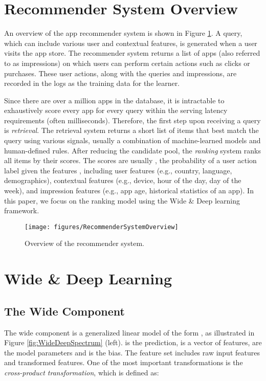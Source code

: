 \documentclass{sig-alternate-05-2015}
\begin{document}
\section{Recommender System Overview}

An overview of the app recommender system is shown in Figure \ref{fig:RecommenderSystemOverview}. A query, which can include various user and contextual features, is generated when a user visits the app store. The recommender system returns a list of apps (also referred to as impressions) on which users can perform certain actions such as clicks or purchases. These user actions, along with the queries and impressions, are recorded in the logs as the training data for the learner.

Since there are over a million apps in the database, it is intractable to exhaustively score every app for every query within the serving latency requirements (often  milliseconds). Therefore, the first step upon receiving a query is \textit{retrieval}. The retrieval system returns a short list of items that best match the query using various signals, usually a combination of machine-learned models and human-defined rules. After reducing the candidate pool, the \textit{ranking} system ranks all items by their scores. The scores are usually , the probability of a user action label  given the features , including user features (e.g., country, language, demographics), contextual features (e.g., device, hour of the day, day of the week), and impression features (e.g., app age, historical statistics of an app). In this paper, we focus on the ranking model using the Wide \& Deep learning framework.

\begin{figure}[t!]
	\centering
	\texttt{[image: figures/RecommenderSystemOverview]}
	\caption{Overview of the recommender system.}
	\label{fig:RecommenderSystemOverview}
\end{figure}

\section{Wide \& Deep Learning}

\subsection{The Wide Component}
The wide component is a generalized linear model of the form , as illustrated in Figure \ref{fig:WideDeepSpectrum} (left).  is the prediction,  is a vector of  features,  are the model parameters and  is the bias. The feature set includes raw input features and transformed features. One of the most important transformations is the \textit{cross-product transformation}, which is defined as:
\end{document}
